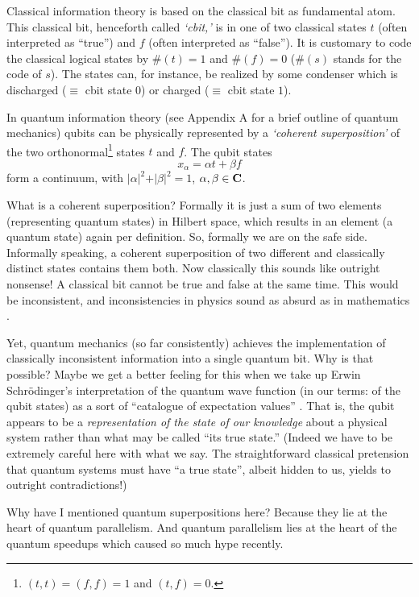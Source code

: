 \documentclass [11pt]{llncs}
\begin{document}
Classical information theory is based on the
classical bit as
fundamental atom. This classical bit, henceforth called
{\em `cbit,'} is in one of two
classical states $t$ (often interpreted as ``true'') and $f$ (often
interpreted as ``false'').
It is customary to code the classical logical states by
$\# ( t) =1$ and $\# ( f) =0$ ($\# (s)$ stands for the code of $s$).
The states can, for instance, be realized by some  condenser
which is discharged ($\equiv$ cbit state $0$) or charged ($\equiv$ cbit state $1$).

In quantum information theory
(see Appendix A for a brief outline of quantum mechanics)
qubits can be physically represented by a {\em `coherent superposition'}
of the two orthonormal\footnote{
$(t,t)=(f,f)=1$ and $(t,f)=0$.}
 states $t$ and $f$.
The qubit states
\begin{equation}
x_{\alpha}  =\alpha t+\beta f
\end{equation}
form a continuum, with
$ \vert \alpha \vert^2+\vert \beta \vert^2=1$, $\alpha ,\beta \in {\bf C}$.


What is a coherent superposition?
Formally it is just a sum of two elements (representing quantum states) in Hilbert space,
which results in an element (a quantum state) again per definition.
So, formally we are on the safe side.
Informally speaking, a coherent superposition of two different
and classically distinct states contains them both.
Now classically this sounds like outright nonsense!
A classical bit cannot be true and false at the same time.
This would be inconsistent, and inconsistencies in physics sound as
absurd as in mathematics \cite{hilbert-26}.

Yet, quantum mechanics (so far consistently) achieves the implementation of
classically inconsistent information into a single quantum bit.
Why is that possible?
Maybe we get a better feeling for this when we take up Erwin Schr\"odinger's
interpretation of the quantum wave function (in our terms: of the qubit states)
as a sort of ``catalogue of expectation values'' \cite{schrodinger}.
That is, the qubit appears to be a {\em representation of the state of our knowledge} about a physical system
rather than what may be called ``its true state.''
(Indeed we have to be extremely careful here with what we say.
The straightforward classical pretension that quantum systems must have ``a true state'',
albeit hidden to us, yields to outright contradictions!)

Why have I mentioned quantum superpositions here?
Because they lie at the heart of quantum parallelism.
And quantum parallelism lies at the heart of the quantum speedups
which caused so much hype recently.
\end{document}

